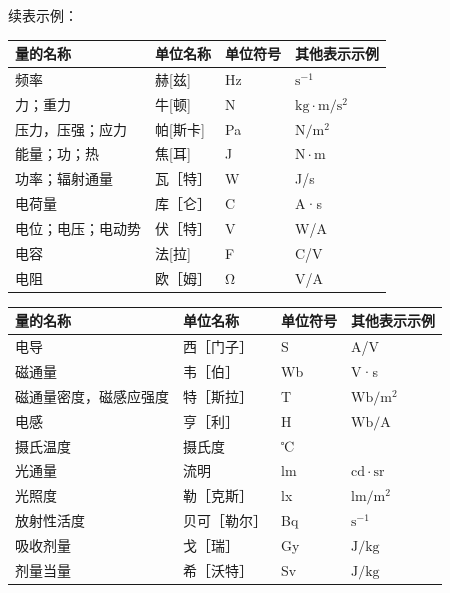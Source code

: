 续表示例：
\begin{table}[h!]
    \centering{}
    \label{label:tab2}
    \noindent\renewcommand{\arraystretch}{0.9}
    \begin{tabular}{P{12em}P{6em}P{6em}P{8em}}
        \toprule
        量的名称 & 单位名称 & 单位符号 & 其他表示示例 \\\midrule
        频率  & 赫[兹] & Hz & $\mathrm{s}^{-1}$ \\
        力；重力 & 牛[顿] & N & $\mathrm{kg}\cdot\mathrm{m}/\mathrm{s}^2$ \\
        压力，压强；应力 & 帕[斯卡] & Pa & $\mathrm{N}/\mathrm{m}^2$ \\
        能量；功；热 & 焦[耳] & J & $\mathrm{N}\cdot\mathrm{m}$ \\
        		功率；辐射通量&	瓦［特］	& W	 &J/s\\
        电荷量&	库［仑］	& C	& A·s\\
        电位；电压；电动势&	伏［特］&	V	& W/A\\
        		电容&	法[拉]&	F&C/V\\
        				电阻&	欧［姆］&	Ω&	V/A\\
        \bottomrule
    \end{tabular}
\end{table}

\begin{table}[h!]
	\ContinuedFloat
	\centering
	\noindent\renewcommand{\arraystretch}{0.9}
	\begin{tabular}{P{12em}P{6em}P{6em}P{8em}}
		\toprule
		量的名称 & 单位名称 & 单位符号 & 其他表示示例 \\\midrule  
		电导&	西［门子］&	S&	A/V\\    
		磁通量	& 韦［伯］&	Wb&	V·s\\
		磁通量密度，磁感应强度	& 特［斯拉］&	T	& $\mathrm{Wb}/\mathrm{m}^2$\\
		电感	& 亨［利］&	H&	$\mathrm{Wb}/\mathrm{A}$\\
		摄氏温度&	摄氏度	& ℃	&\\
		光通量&	流明	& lm	& $\mathrm{cd}·\mathrm{sr}$\\
		光照度&	勒［克斯］&	lx&	$\mathrm{lm}/\mathrm{m}^2$\\
		放射性活度&	贝可［勒尔］&	Bq&$\mathrm{s}^{-1}$\\
		吸收剂量&	戈［瑞］&	Gy&	$\mathrm{J}/\mathrm{kg}$\\
		剂量当量&	希［沃特］&	Sv&	$\mathrm{J}/\mathrm{kg}$\\
		\bottomrule
	\end{tabular}
\end{table}

